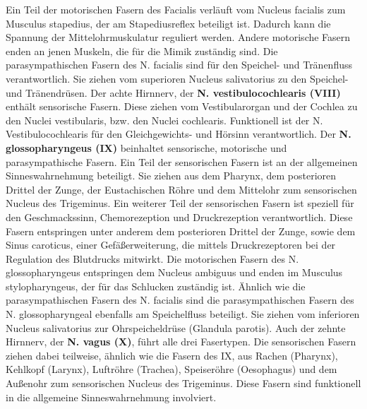 \documentclass[12pt,a4paper,pdftex]{article}
\begin{document}
Ein Teil der motorischen Fasern des Facialis verläuft vom Nucleus facialis zum Musculus stapedius, der am Stapediusreflex beteiligt ist. Dadurch kann die Spannung der Mittelohrmuskulatur reguliert werden. Andere motorische Fasern enden an jenen Muskeln, die für die Mimik zuständig sind.  Die parasympathischen Fasern des N. facialis sind für den Speichel- und Tränenfluss verantwortlich. Sie ziehen vom superioren Nucleus salivatorius zu den Speichel- und Tränendrüsen. Der achte Hirnnerv, der \textbf{N. vestibulocochlearis (VIII)} enthält sensorische Fasern. Diese ziehen vom Vestibularorgan und der Cochlea zu den Nuclei vestibularis, bzw. den Nuclei cochlearis. Funktionell ist der N. Vestibulocochlearis für den Gleichgewichts- und Hörsinn verantwortlich. Der \textbf{N. glossopharyngeus (IX)} beinhaltet sensorische, motorische und parasympathische Fasern. Ein Teil der sensorischen Fasern ist an der allgemeinen Sinneswahrnehmung beteiligt. Sie ziehen aus dem Pharynx, dem posterioren Drittel der Zunge, der Eustachischen Röhre und dem Mittelohr zum sensorischen Nucleus des Trigeminus. Ein weiterer Teil der sensorischen Fasern ist speziell für den Geschmackssinn, Chemorezeption und Druckrezeption verantwortlich. Diese Fasern entspringen unter anderem dem posterioren Drittel der Zunge, sowie dem Sinus caroticus, einer Gefäßerweiterung, die mittels Druckrezeptoren bei der Regulation des Blutdrucks mitwirkt. Die motorischen Fasern des N. glossopharyngeus entspringen dem Nucleus ambiguus und enden im Musculus stylopharyngeus, der für das Schlucken zuständig ist. Ähnlich wie die parasympathischen Fasern des N. facialis sind die parasympathischen Fasern des N. glossopharyngeal ebenfalls am Speichelfluss beteiligt. Sie ziehen vom inferioren Nucleus salivatorius zur Ohrspeicheldrüse (Glandula parotis). Auch der zehnte Hirnnerv, der \textbf{N. vagus (X)}, führt alle drei Fasertypen. Die sensorischen Fasern ziehen dabei teilweise, ähnlich wie die Fasern des IX, aus Rachen (Pharynx), Kehlkopf (Larynx), Luftröhre (Trachea), Speiseröhre (Oesophagus) und dem Außenohr zum sensorischen Nucleus des Trigeminus. Diese Fasern sind funktionell in die allgemeine Sinneswahrnehmung involviert. 
\end{document}
